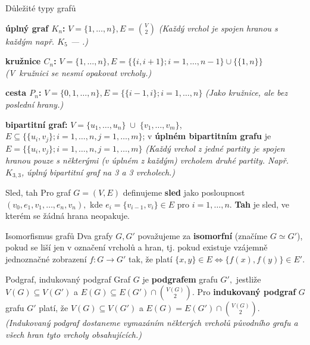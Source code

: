 \begin{definiceN}{Důležité typy grafů}
\begin{pitemize}
\item \textbf{úplný graf $K_n$:} $V=\{1,\dots,n\}, E=\binom{V}{2}$ \textit{(Každý vrchol je spojen hranou s každým např. $K_5$ --- .)}
\item \textbf{kružnice $C_n$:} $V=\{1,\dots,n\}, E=\{\{i, i+1\}; i=1,\dots,n-1\} \cup\{\{1,n\}\}$ \textit{(V~kružnici se nesmí opakovat vrcholy.)}
\item \textbf{cesta $P_n$:} $V=\{0,1,\dots,n\}, E=\{\{i-1,i\}; i=1,\dots,n\}$ \textit{(Jako kružnice, ale bez poslední hrany.)}
\item \textbf{bipartitní graf:} $V=\{u_1,\dots,u_n\} \; \cup \; \{v_1,\dots,v_m\}$, $E \subseteq \{\{u_i,v_j\}; i=1,\dots,n, j=1,\dots,m\}$; v \textbf{úplném bipartitním grafu} je $E = \{\{u_i,v_j\}; i=1,\dots,n, j=1,\dots,m\}$ \textit{(Každý vrchol z jedné partity je spojen hranou pouze s některými (v úplném z každým) vrcholem druhé partity. Např. $K_{3,3}$, úplný bipartitní graf na 3 a 3 vrcholech.)}
\end{pitemize}
\end{definiceN}

\begin{definiceN}{Sled, tah}
Pro graf $G=(V,E)$ definujeme \textbf{sled} jako posloupnost $(v_0,e_1,v_1,\dots,e_n,v_n),$ kde $e_i=\{v_{i-1},v_i\} \in E$ pro $i=1,\dots,n.$ \textbf{Tah} je sled, ve kterém se žádná hrana neopakuje.
\end{definiceN}

\begin{definiceN}{Isomorfismus grafů}
Dva grafy $G, G'$ považujeme za \textbf{isomorfní} (značíme $G\simeq G'$), pokud se liší jen v označení vrcholů a hran, tj. pokud existuje vzájemně jednoznačné zobrazení $f: G \rightarrow G'$ tak, že platí $\{x,y\}\in E \Leftrightarrow \{f(x),f(y)\} \in E'.$
\end{definiceN}

\begin{definiceN}{Podgraf, indukovaný podgraf}
Graf $G$ je \textbf{podgrafem} grafu $G',$ jestliže $V(G)\subseteq V(G')$ a $E(G)\subseteq E(G') \cap \binom{V(G)}{2}$. Pro \textbf{indukovaný podgraf} $G$ grafu $G'$ platí, že $V(G)\subseteq V(G')$ a $E(G) = E(G') \cap \binom{V(G)}{2}.$ \textit{(Indukovaný podgraf dostaneme vymazáním některých vrcholů původního grafu a všech hran tyto vrcholy obsahujících.)}
\end{definiceN}

